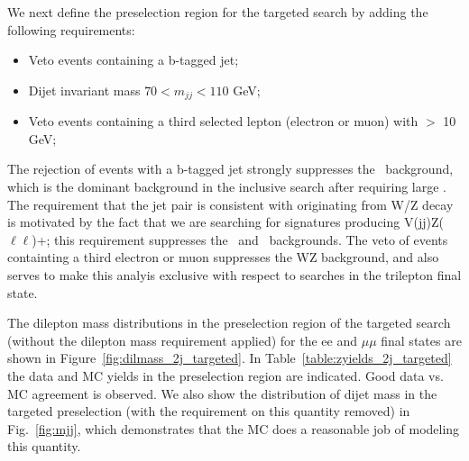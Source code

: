 \clearpage

We next define the preselection region for the targeted search by adding the following requirements:
\begin{itemize}
\item Veto events containing a b-tagged jet;
\item Dijet invariant mass $70<m_{jj}<110$ GeV;
\item Veto events containing a third selected lepton (electron or muon) with \pt $>$ 10 GeV; 
\end{itemize}

The rejection of events with a b-tagged jet strongly suppresses the \ttbar\ background, which is the dominant background in the inclusive search
after requiring large \MET. The requirement that the jet pair is consistent with originating from W/Z decay is motivated by the fact that we are 
searching for signatures producing V(jj)Z($\ell\ell$)+\MET; this requirement suppresses the \zjets\ and \ttbar\ backgrounds. The veto of events
containting a third electron or muon suppresses the WZ background, and also serves to make this analyis exclusive with respect to searches in
the trilepton final state.

The dilepton mass distributions in the preselection region of the targeted search (without the dilepton mass requirement applied) 
for the ee and $\mu\mu$ final states are shown in Figure~\ref{fig:dilmass_2j_targeted}. In Table~\ref{table:zyields_2j_targeted} 
the data and MC yields in the preselection region are indicated. Good data vs. MC agreement is observed.
We also show the distribution of dijet mass in the targeted preselection (with the requirement on this quantity removed) in Fig.~\ref{fig:mjj},
which demonstrates that the MC does a reasonable job of modeling this quantity.


